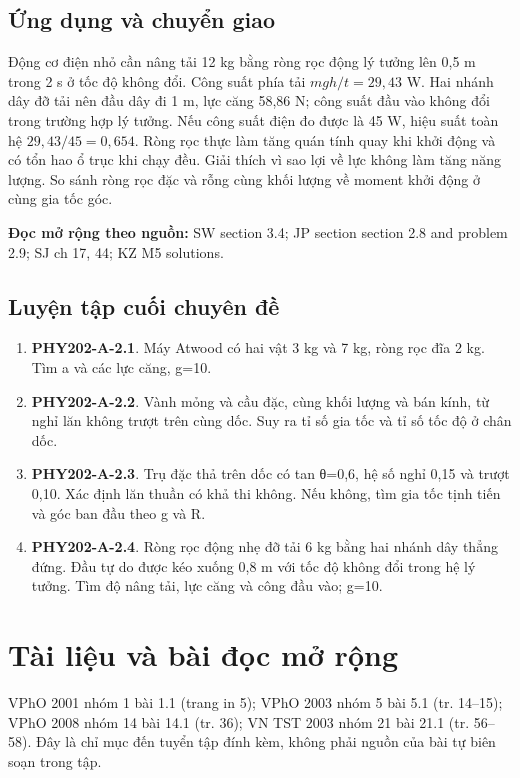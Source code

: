 \documentclass[11pt,a4paper,openany]{book}
\begin{document}
\section{Ứng dụng và chuyển giao}
Động cơ điện nhỏ cần nâng tải 12 kg bằng ròng rọc động lý tưởng lên 0,5 m trong 2 s ở tốc độ không đổi. Công suất phía tải $mgh/t=29{,}43$ W. Hai nhánh dây đỡ tải nên đầu dây đi 1 m, lực căng 58,86 N; công suất đầu vào không đổi trong trường hợp lý tưởng. Nếu công suất điện đo được là 45 W, hiệu suất toàn hệ $29{,}43/45=0{,}654$. Ròng rọc thực làm tăng quán tính quay khi khởi động và có tổn hao ổ trục khi chạy đều. Giải thích vì sao lợi về lực không làm tăng năng lượng. So sánh ròng rọc đặc và rỗng cùng khối lượng về moment khởi động ở cùng gia tốc góc.

\textbf{Đọc mở rộng theo nguồn:} SW section 3.4; JP section section 2.8 and problem 2.9; SJ ch 17, 44; KZ M5 solutions.

\section{Luyện tập cuối chuyên đề}
\begin{enumerate}
\item \textbf{PHY202-A-2.1}. Máy Atwood có hai vật 3 kg và 7 kg, ròng rọc đĩa 2 kg. Tìm a và các lực căng, g=10.
\item \textbf{PHY202-A-2.2}. Vành mỏng và cầu đặc, cùng khối lượng và bán kính, từ nghỉ lăn không trượt trên cùng dốc. Suy ra tỉ số gia tốc và tỉ số tốc độ ở chân dốc.
\item \textbf{PHY202-A-2.3}. Trụ đặc thả trên dốc có tan θ=0,6, hệ số nghỉ 0,15 và trượt 0,10. Xác định lăn thuần có khả thi không. Nếu không, tìm gia tốc tịnh tiến và góc ban đầu theo g và R.
\item \textbf{PHY202-A-2.4}. Ròng rọc động nhẹ đỡ tải 6 kg bằng hai nhánh dây thẳng đứng. Đầu tự do được kéo xuống 0,8 m với tốc độ không đổi trong hệ lý tưởng. Tìm độ nâng tải, lực căng và công đầu vào; g=10.
\end{enumerate}
\chapter*{Tài liệu và bài đọc mở rộng}
VPhO 2001 nhóm 1 bài 1.1 (trang in 5); VPhO 2003 nhóm 5 bài 5.1 (tr. 14–15); VPhO 2008 nhóm 14 bài 14.1 (tr. 36); VN TST 2003 nhóm 21 bài 21.1 (tr. 56–58). Đây là chỉ mục đến tuyển tập đính kèm, không phải nguồn của bài tự biên soạn trong tập.
\end{document}
